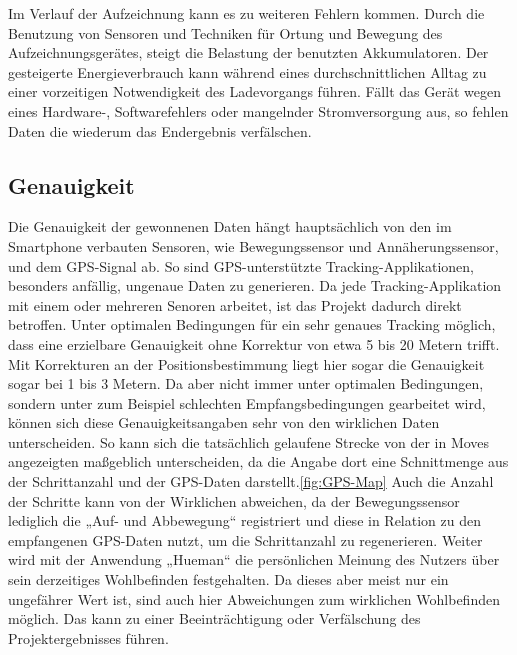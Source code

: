Im Verlauf der Aufzeichnung kann es zu weiteren Fehlern kommen.
Durch die Benutzung von Sensoren und Techniken für Ortung und Bewegung des Aufzeichnungsgerätes, steigt die Belastung der benutzten Akkumulatoren.
Der gesteigerte Energieverbrauch kann während eines durchschnittlichen Alltag zu einer vorzeitigen Notwendigkeit des Ladevorgangs führen.
Fällt das Gerät wegen eines Hardware-, Softwarefehlers oder mangelnder Stromversorgung aus, so fehlen Daten die wiederum das Endergebnis verfälschen.

\subsection{Genauigkeit}
\label{ch:Relativierung:sec:SystematischeUndZufälligeFehler:subsec:Genauigkeit}

Die Genauigkeit der gewonnenen Daten hängt hauptsächlich von den im Smartphone verbauten Sensoren, wie Bewegungssensor und Annäherungssensor, und  dem GPS-Signal ab.
So sind GPS-unterstützte Tracking-Applikationen, besonders  anfällig, ungenaue Daten zu generieren.
Da jede Tracking-Applikation mit einem oder mehreren Senoren arbeitet, ist das Projekt dadurch direkt betroffen. 
Unter optimalen Bedingungen für ein sehr genaues Tracking möglich, dass eine erzielbare Genauigkeit ohne Korrektur von etwa 5 bis 20 Metern trifft. 
Mit Korrekturen an der Positionsbestimmung liegt hier sogar die Genauigkeit sogar bei 1 bis 3 Metern. \cite{web:GPS}
Da aber nicht immer unter optimalen Bedingungen, sondern unter zum Beispiel schlechten Empfangsbedingungen gearbeitet wird, können sich diese Genauigkeitsangaben sehr von den wirklichen Daten unterscheiden.  
So kann sich die tatsächlich gelaufene Strecke von der in Moves angezeigten maßgeblich unterscheiden, da die Angabe dort eine Schnittmenge aus der Schrittanzahl und der GPS-Daten darstellt.\ref{fig:GPS-Map}
Auch die Anzahl der Schritte kann von der Wirklichen abweichen, da der Bewegungssensor lediglich die „Auf- und Abbewegung“ registriert und diese in Relation zu den empfangenen GPS-Daten nutzt, um die Schrittanzahl zu regenerieren.
Weiter wird mit der Anwendung „Hueman“ die persönlichen Meinung des Nutzers über sein derzeitiges Wohlbefinden festgehalten. 
Da dieses aber meist nur ein ungefährer Wert ist, sind auch hier Abweichungen zum wirklichen Wohlbefinden möglich.
Das kann zu einer Beeinträchtigung oder Verfälschung des Projektergebnisses führen.


